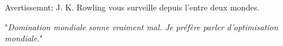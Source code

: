 Avertissemnt: J. K. Rowling vous surveille depuis l'entre deux mondes.


"\emph{Domination mondiale sonne vraiment mal. Je préfère parler d'optimisation mondiale.}"

